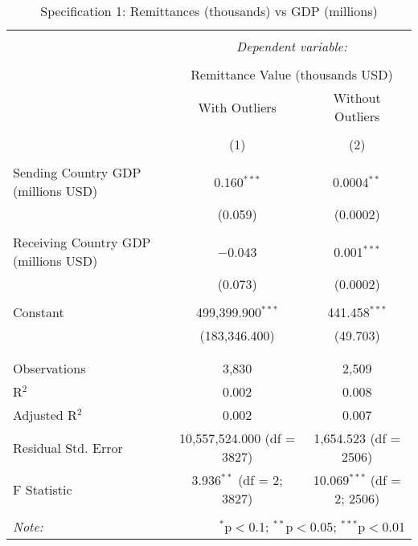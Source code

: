 
\begin{table}[!htbp] \centering 
  \caption{Specification 1: Remittances (thousands) vs GDP (millions)} 
  \label{} 
\begin{tabular}{@{\extracolsep{5pt}}lcc} 
\\[-1.8ex]\hline 
\hline \\[-1.8ex] 
 & \multicolumn{2}{c}{\textit{Dependent variable:}} \\ 
\cline{2-3} 
\\[-1.8ex] & \multicolumn{2}{c}{Remittance Value (thousands USD)} \\ 
 & With Outliers & Without Outliers \\ 
\\[-1.8ex] & (1) & (2)\\ 
\hline \\[-1.8ex] 
 Sending Country GDP (millions USD) & 0.160$^{***}$ & 0.0004$^{**}$ \\ 
  & (0.059) & (0.0002) \\ 
  & & \\ 
 Receiving Country GDP (millions USD) & $-$0.043 & 0.001$^{***}$ \\ 
  & (0.073) & (0.0002) \\ 
  & & \\ 
 Constant & 499,399.900$^{***}$ & 441.458$^{***}$ \\ 
  & (183,346.400) & (49.703) \\ 
  & & \\ 
\hline \\[-1.8ex] 
Observations & 3,830 & 2,509 \\ 
R$^{2}$ & 0.002 & 0.008 \\ 
Adjusted R$^{2}$ & 0.002 & 0.007 \\ 
Residual Std. Error & 10,557,524.000 (df = 3827) & 1,654.523 (df = 2506) \\ 
F Statistic & 3.936$^{**}$ (df = 2; 3827) & 10.069$^{***}$ (df = 2; 2506) \\ 
\hline 
\hline \\[-1.8ex] 
\textit{Note:}  & \multicolumn{2}{r}{$^{*}$p$<$0.1; $^{**}$p$<$0.05; $^{***}$p$<$0.01} \\ 
\end{tabular} 
\end{table} 
